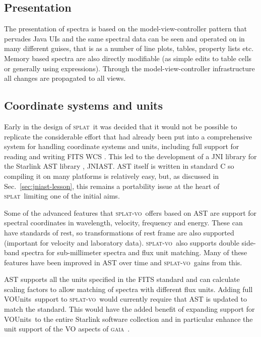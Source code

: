 \documentclass[final,authoryear,5p,times,twocolumn]{elsarticle}
\newcommand{\vounits}{VOUnits}
\newcommand{\splat}{\textsc{splat}}
\newcommand{\splatvo}{\textsc{splat-vo}}
\newcommand{\gaia}{\textsc{gaia}}
\newcommand{\ascl}[1]{\href{http://www.ascl.net/#1}{ascl:#1}}
\begin{document}
\subsection{Presentation}

The presentation of spectra is based on the model-view-controller pattern that
pervades Java UIs and the same spectral data can be seen and operated on in
many different guises, that is as a number of line plots, tables, property
lists etc. Memory based spectra are also directly modifiable (as simple edits
to table cells or generally using expressions). Through the
model-view-controller infrastructure all changes are propagated to all views.


\subsection{Coordinate systems and units}

Early in the design of \splat\ it was decided that it would not be possible to
replicate the considerable effort that had already been put into a
comprehensive system for handling coordinate systems and units, including full
support for reading and writing FITS WCS \citep{2006A&A...446..747G}. This led to the development of a JNI
library for the Starlink AST library \citep[][\ascl{1404.016}]{1998ASPC..145...41W,2012ASPC..461..825B}, JNIAST. AST
itself is written in standard C so compiling it on many platforms is
relatively easy, but, as discussed in Sec.\ \ref{sec:jniast-lesson}, this remains a portability issue at the heart of \splat\
limiting one of the initial aims.

Some of the advanced features that \splatvo\ offers based on AST are support
for spectral coordinates in wavelength, velocity, frequency and energy. These
can have standards of rest, so transformations of rest frame are also
supported (important for velocity and laboratory data). \splatvo\ also supports
double side-band spectra for sub-millimeter spectra and flux unit matching. Many of these features
have been improved in AST over time and \splatvo\ gains from this.

AST supports all the units specified in the FITS standard
\citep{2010A&A...524A..42P} and can calculate scaling factors to allow
matching of spectra with different flux units. Adding full \vounits\
support \citep{vounits} to \splatvo\ would currently require that AST
is updated to match the standard. This would have the added benefit of
expanding support for \vounits\ to the entire Starlink software
collection and in particular enhance the unit support of the VO
aspects of \gaia\ \citep{2009ASPC..411..575D}.
\end{document}
